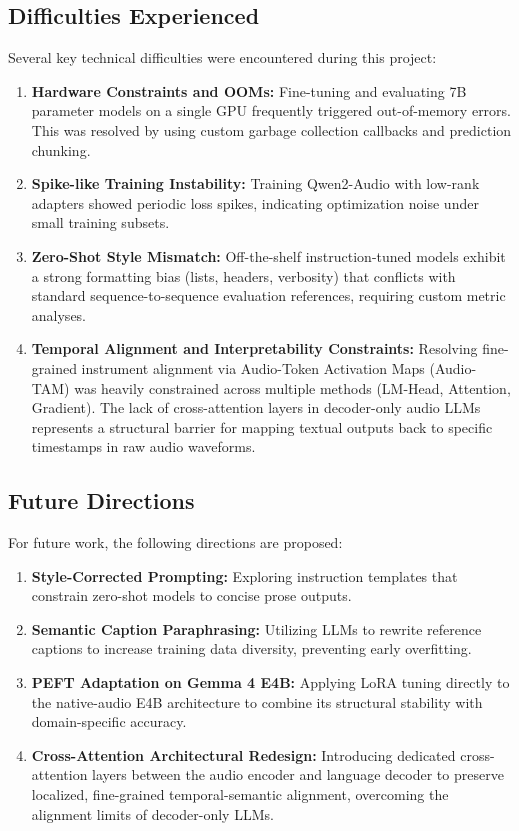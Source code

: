 \documentclass[12pt, conference, letterpaper]{IEEEtran}
\begin{document}
\subsection{Difficulties Experienced}
Several key technical difficulties were encountered during this project:
\begin{enumerate}
    \item \textbf{Hardware Constraints and OOMs:} Fine-tuning and evaluating 7B parameter models on a single GPU frequently triggered out-of-memory errors. This was resolved by using custom garbage collection callbacks and prediction chunking.
    \item \textbf{Spike-like Training Instability:} Training Qwen2-Audio with low-rank adapters showed periodic loss spikes, indicating optimization noise under small training subsets.
    \item \textbf{Zero-Shot Style Mismatch:} Off-the-shelf instruction-tuned models exhibit a strong formatting bias (lists, headers, verbosity) that conflicts with standard sequence-to-sequence evaluation references, requiring custom metric analyses.
    \item \textbf{Temporal Alignment and Interpretability Constraints:} Resolving fine-grained instrument alignment via Audio-Token Activation Maps (Audio-TAM) was heavily constrained across multiple methods (LM-Head, Attention, Gradient). The lack of cross-attention layers in decoder-only audio LLMs represents a structural barrier for mapping textual outputs back to specific timestamps in raw audio waveforms.
\end{enumerate}

\subsection{Future Directions}
For future work, the following directions are proposed:
\begin{enumerate}
    \item \textbf{Style-Corrected Prompting:} Exploring instruction templates that constrain zero-shot models to concise prose outputs.
    \item \textbf{Semantic Caption Paraphrasing:} Utilizing LLMs to rewrite reference captions to increase training data diversity, preventing early overfitting.
    \item \textbf{PEFT Adaptation on Gemma 4 E4B:} Applying LoRA tuning directly to the native-audio E4B architecture to combine its structural stability with domain-specific accuracy.
    \item \textbf{Cross-Attention Architectural Redesign:} Introducing dedicated cross-attention layers between the audio encoder and language decoder to preserve localized, fine-grained temporal-semantic alignment, overcoming the alignment limits of decoder-only LLMs.
\end{enumerate}



\end{document}
